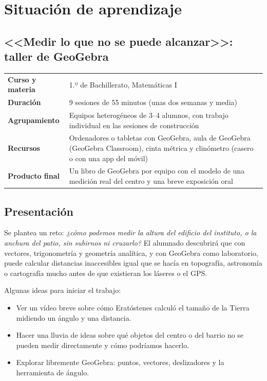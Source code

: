 \documentclass[11pt,a4paper]{article}
\begin{document}
\section{Situación de aprendizaje}
\subsection*{<<Medir lo que no se puede alcanzar>>: taller de GeoGebra}

{\small
\renewcommand{\arraystretch}{1.25}
\begin{tabularx}{\linewidth}{>{\bfseries\color{acento}}l X}
\toprule
Curso y materia & 1.º de Bachillerato, Matemáticas I \\
Duración & 9 sesiones de 55 minutos (unas dos semanas y media) \\
Agrupamiento & Equipos heterogéneos de 3--4 alumnos, con trabajo individual en las sesiones de construcción \\
Recursos & Ordenadores o tabletas con GeoGebra, aula de GeoGebra (GeoGebra Classroom), cinta métrica y clinómetro (casero o con una app del móvil) \\
Producto final & Un libro de GeoGebra por equipo con el modelo de una medición real del centro y una breve exposición oral \\
\bottomrule
\end{tabularx}
}

\subsection{Presentación}
Se plantea un reto: \emph{¿cómo podemos medir la altura del edificio del
instituto, o la anchura del patio, sin subirnos ni cruzarlo?} El alumnado
descubrirá que con vectores, trigonometría y geometría analítica, y con
GeoGebra como laboratorio, puede calcular distancias inaccesibles igual que se
hacía en topografía, astronomía o cartografía mucho antes de que existieran
los láseres o el GPS.

Algunas ideas para iniciar el trabajo:
\begin{itemize}
  \item Ver un vídeo breve sobre cómo Eratóstenes calculó el tamaño de la
    Tierra midiendo un ángulo y una distancia.
  \item Hacer una lluvia de ideas sobre qué objetos del centro o del barrio
    no se pueden medir directamente y cómo podríamos hacerlo.
  \item Explorar libremente GeoGebra: puntos, vectores, deslizadores y la
    herramienta de ángulo.
\end{itemize}
\end{document}

